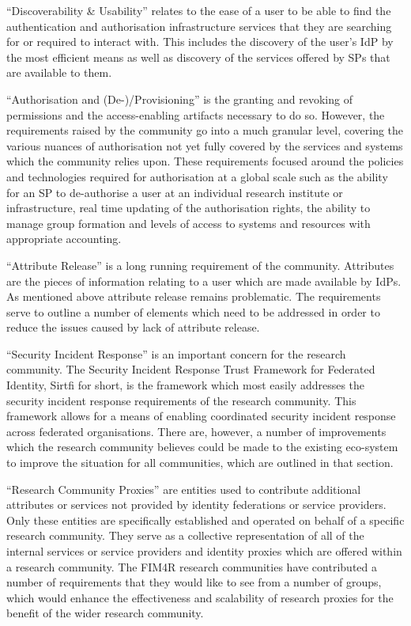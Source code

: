 \documentclass[fleqn,10pt]{wlscirep}
\begin{document}
{“Discoverability \& Usability” relates to the ease of a user to be able to find the authentication and authorisation infrastructure services that they are searching for or required to interact with.  This includes the discovery of the user’s IdP by the most efficient means as well as discovery of the services offered by SPs that are available to them. 

“Authorisation and (De-)/Provisioning” is the granting and revoking of permissions and the access-enabling artifacts necessary to do so.  However, the requirements raised by the community go into a much granular level, covering the various nuances of authorisation not yet fully covered by the services and systems which the community relies upon.  These requirements focused around the policies and technologies required for authorisation at a global scale such as the ability for an SP to de-authorise a user at an individual research institute or infrastructure, real time updating of the authorisation rights, the ability to manage group formation and levels of access to systems and resources with appropriate accounting.     

“Attribute Release” is a long running requirement of the community.  Attributes are the pieces of information relating to a user which are made available by IdPs.  As mentioned above attribute release remains problematic. The requirements serve to outline a number of elements which need to be addressed in order to reduce the issues caused by lack of attribute release.  

“Security Incident Response” is an important concern for the research community.  The Security Incident Response Trust Framework for Federated Identity, Sirtfi for short, is the framework which most easily addresses the security incident response requirements of the research community.  This framework allows for a means of enabling coordinated security incident response across federated organisations. There are, however, a number of improvements which the research community believes could be made to the existing eco-system to improve the situation for all communities, which are outlined in that section.

“Research Community Proxies” are entities used to contribute additional attributes or services not provided by identity federations or service providers.  Only these entities are specifically established and operated on behalf of a specific research community.  They serve as a collective representation of all of the internal services or service providers and identity proxies which are offered within a research community. The FIM4R research communities have contributed a number of requirements that they would like to see from a number of groups, which would enhance the effectiveness and scalability of research proxies for the benefit of the wider research community. 

}
\end{document}
